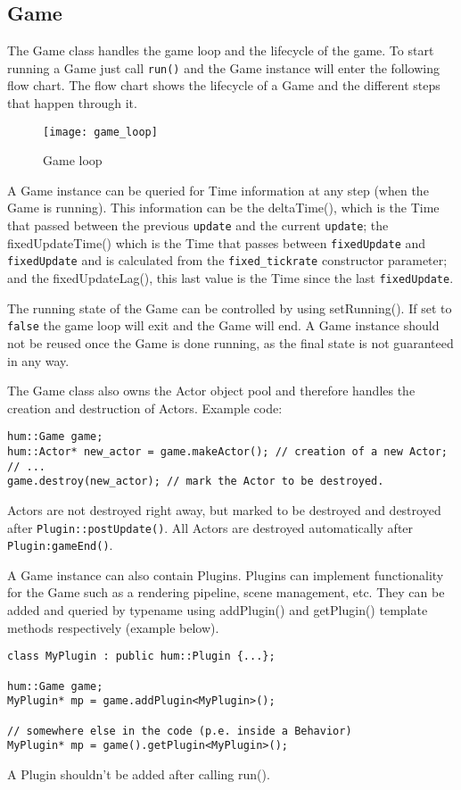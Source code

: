 \subsection{Game}

The Game class handles the game loop and the lifecycle of the game. To start
running a Game just call \texttt{run()} and the Game instance will enter the
following flow chart. The flow chart shows the lifecycle of a Game and the
different steps that happen through it.


\begin{figure}[H]
    \centering
    \texttt{[image: game\_loop]}
    \caption{Game loop}
    \label{fig:game_loop}
\end{figure}

A Game instance can be queried for Time information at any step (when the
Game is running). This information can be the deltaTime(), which is the Time
that passed between the previous \texttt{update} and the current \texttt{update}; the fixedUpdateTime() which is
the Time that passes between \texttt{fixedUpdate} and \texttt{fixedUpdate} and is calculated
from the \texttt{fixed\_tickrate} constructor parameter; and the
fixedUpdateLag(), this last value is the Time since the last \texttt{fixedUpdate}.

The running state of the Game can be controlled by using setRunning(). If set
to \texttt{false} the game loop will exit and the Game will end. A Game instance
should not be reused once the Game is done running, as the final state is not
guaranteed in any way.

The Game class also owns the Actor object pool and therefore handles the
creation and destruction of Actors. Example code:

\begin{lstlisting}[caption=Creation and destruction of an Actor]
hum::Game game;
hum::Actor* new_actor = game.makeActor(); // creation of a new Actor;
// ...
game.destroy(new_actor); // mark the Actor to be destroyed.
\end{lstlisting}

Actors are not destroyed right away, but marked to be destroyed and destroyed
after \texttt{Plugin::postUpdate()}. All Actors are destroyed automatically after
\texttt{Plugin:gameEnd()}.

A Game instance can also contain Plugins. Plugins can implement functionality
for the Game such as a rendering pipeline, scene management, etc. They can be
added and queried by typename using addPlugin() and getPlugin() template methods
respectively (example below).

\begin{lstlisting}[caption=Plugin usage example]
class MyPlugin : public hum::Plugin {...};

hum::Game game;
MyPlugin* mp = game.addPlugin<MyPlugin>();

// somewhere else in the code (p.e. inside a Behavior)
MyPlugin* mp = game().getPlugin<MyPlugin>();
\end{lstlisting}

A Plugin shouldn't be added after calling run().
